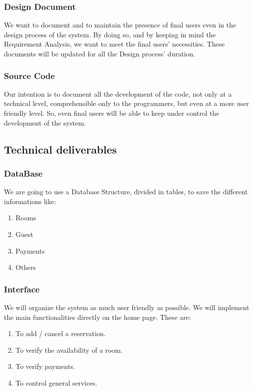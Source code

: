 \subsubsection{Design Document}

We want to document and to maintain the presence of final users even in the design process of the system. 
By doing so, and by keeping in mind the Requirement Analysis, we want to meet the final users’ necessities. 
These documents will be updated for all the Design process’ duration.

\subsubsection{Source Code}

Our intention is to document all the development of the code, not only at a technical level, comprehensible only to the programmers, but even at a more user friendly level. 
So, even final users will be able to keep under control the development of the system.

\subsection{Technical deliverables}

\subsubsection{DataBase}

We are going to use a Database Structure, divided in tables, to save the different informations like:
\begin{enumerate}
	\item Rooms
	\item Guest
	\item Payments 
	\item Others
\end{enumerate}

\subsubsection{Interface}

We will organize the system as much user friendly as possible. 
We will implement the main functionalities directly on the home page. These are:
\begin{enumerate}
	\item To add / cancel a reservation.
	\item To verify the availability of a room.
	\item To verify payments.
	\item To control general services.
\end{enumerate}

